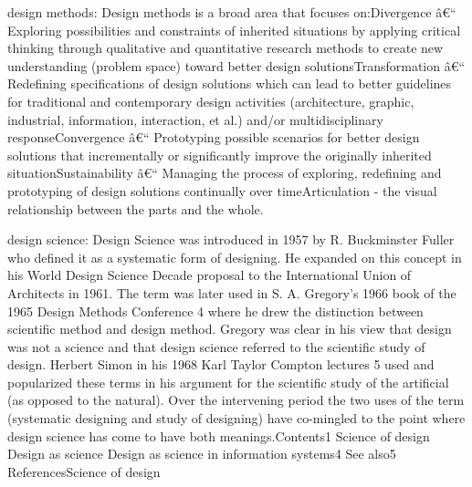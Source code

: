 \documentclass[]{book}
\newcommand{\euro}{€}
\begin{document}
design methods: Design methods is a broad area that focuses
on:Divergence â\euro{}`` Exploring possibilities and constraints of
inherited situations by applying critical thinking through qualitative
and quantitative research methods to create new understanding (problem
space) toward better design solutionsTransformation â\euro{}``
Redefining specifications of design solutions which can lead to better
guidelines for traditional and contemporary design activities
(architecture, graphic, industrial, information, interaction, et al.)
and/or multidisciplinary responseConvergence â\euro{}`` Prototyping
possible scenarios for better design solutions that incrementally or
significantly improve the originally inherited situationSustainability
â\euro{}`` Managing the process of exploring, redefining and prototyping
of design solutions continually over timeArticulation - the visual
relationship between the parts and the whole.

design science: Design Science was introduced in 1957 by R. Buckminster
Fuller who defined it as a systematic form of designing. He expanded on
this concept in his World Design Science Decade proposal to the
International Union of Architects in 1961. The term was later used in S.
A. Gregory's 1966 book of the 1965 Design Methods Conference 4 where he
drew the distinction between scientific method and design method.
Gregory was clear in his view that design was not a science and that
design science referred to the scientific study of design. Herbert Simon
in his 1968 Karl Taylor Compton lectures 5 used and popularized these
terms in his argument for the scientific study of the artificial (as
opposed to the natural). Over the intervening period the two uses of the
term (systematic designing and study of designing) have co-mingled to
the point where design science has come to have both meanings.Contents1
Science of design Design as science Design as science in information
systems4 See also5 ReferencesScience of design
\end{document}
